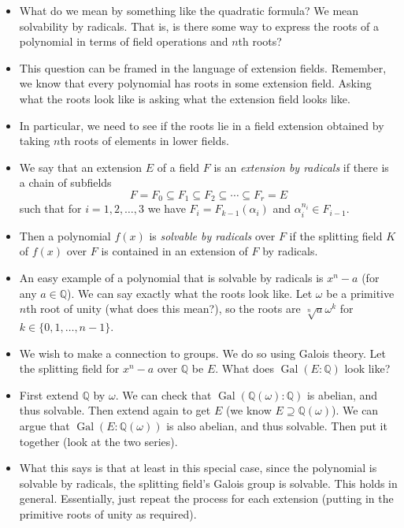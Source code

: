 \documentclass[12pt]{article}
\theoremstyle{plain}
\theoremstyle{definition}
\theoremstyle{remark}
\def\Q{\mathbb Q}
\DeclareMathOperator{\Gal}{Gal}
\begin{document}
\begin{itemize}
\item What do we mean by something like the quadratic formula?  We mean solvability by radicals.  That is, is there some way to express the roots of a polynomial in terms of field operations and $n$th roots?  
\item This question can be framed in the language of extension fields.  Remember, we know that every polynomial has roots in some extension field.  Asking what the roots look like is asking what the extension field looks like.
\item In particular, we need to see if the roots lie in a field extension obtained by taking $n$th roots of elements in lower fields.

\item We say that an extension $E$ of a field $F$ is an \emph{extension by radicals} if there is a chain of subfields 
\[F = F_0 \subseteq F_1 \subseteq F_2 \subseteq \cdots \subseteq F_r = E\]
such that for $i = 1,2,\ldots, 3$ we have $F_i = F_{k-1}(\alpha_i)$ and $\alpha_i^{n_i} \in F_{i-1}$.
\item Then a polynomial $f(x)$ is \emph{solvable by radicals} over $F$ if the splitting field $K$ of $f(x)$ over $F$ is contained in an extension of $F$ by radicals.

\item An easy example of a polynomial that is solvable by radicals is $x^n - a$ (for any $a \in \Q$).  We can say exactly what the roots look like.  Let $\omega$ be a primitive $n$th root of unity (what does this mean?), so the roots are $\sqrt[n]{a}\omega^{k}$ for $k \in \{0,1,\ldots, n-1\}$.

\item We wish to make a connection to groups.  We do so using Galois theory.  Let the splitting field for $x^n - a$ over $\Q$ be $E$.  What does $\Gal(E:\Q)$ look like?

\item First extend $\Q$ by $\omega$.  We can check that $\Gal(\Q(\omega):\Q)$ is abelian, and thus solvable.  Then extend again to get $E$ (we know $E \supseteq \Q(\omega)$).  We can argue that $\Gal(E:\Q(\omega))$ is also abelian, and thus solvable.  Then put it together (look at the two series).

\item What this says is that at least in this special case, since the polynomial is solvable by radicals, the splitting field's Galois group is solvable.  This holds in general.  Essentially, just repeat the process for each extension (putting in the primitive roots of unity as required).


\end{itemize}
\end{document}
